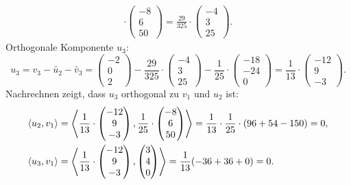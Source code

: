 \documentclass[german,12pt]{homework}
\newcommand{\dotproduct}[2]{\left\langle#1, #2\right\rangle}
\DeclarePairedDelimiter{\enbrace}{(}{)}
\begin{document}
\begin{enumerate}
\begin{align*}
            \cdot \begin{pmatrix}-8\\6\\50\end{pmatrix} = \frac{29}{325} \cdot
            \begin{pmatrix}-4\\3\\25\end{pmatrix}.
        \end{align*}
        Orthogonale Komponente \(u_3\):
        \[u_3 = v_3 - \tilde{u_2} - \tilde{v_3} = \begin{pmatrix}
        -2\\0\\2\end{pmatrix} - \frac{29}{325} \cdot \begin{pmatrix}
        -4\\3\\25\end{pmatrix} - \frac{1}{25} \cdot \begin{pmatrix}-18\\
        -24\\0\end{pmatrix} = \frac{1}{13} \cdot \begin{pmatrix}-12\\9\\
        -3\end{pmatrix}.\]
        Nachrechnen zeigt, dass \(u_3\) orthogonal zu \(v_1\) und \(u_2\) ist:
        \begin{align*}
            \dotproduct{u_2}{v_1} &= \dotproduct{\frac{1}{13} \cdot
            \begin{pmatrix}-12\\9\\-3\end{pmatrix}}{\frac{1}{25} \cdot 
            \begin{pmatrix}-8\\6\\50\end{pmatrix}} = \frac{1}{13} \cdot
            \frac{1}{25} \cdot \enbrace*{96 + 54 - 150} = 0,\\
            \dotproduct{u_3}{v_1} &= \dotproduct{\frac{1}{13} \cdot
            \begin{pmatrix}-12\\9\\-3\end{pmatrix}}{\begin{pmatrix}3\\4\\0
            \end{pmatrix}} = \frac{1}{13}\enbrace*{-36 + 36 + 0} = 0.
        \end{align*}
    \end{enumerate}
\end{document}
